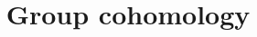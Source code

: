 \documentclass{ximera}
\title{Group cohomology}
\begin{document}
\begin{abstract}

\end{abstract}
\maketitle

\end{document}
